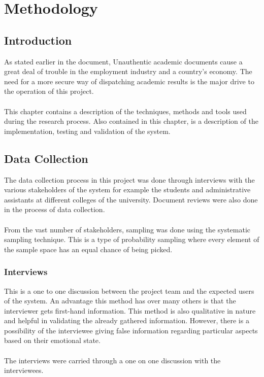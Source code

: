 \chapter{Methodology}

\section{Introduction}
As stated earlier in the document, Unauthentic academic documents cause a great deal of trouble in the employment industry and a country's economy. The need for a more secure way of dispatching academic results is the major drive to the operation of this project. \\~\\



This chapter contains a description of the techniques, methods and tools used during the research process. Also contained in this chapter, is a description of the implementation, testing and validation of the system. 

\section{Data Collection}
The data collection process in this project was done through interviews with the various stakeholders of the system for example the students and administrative assistants at different colleges of the university. Document reviews were also done in the process of data collection.\\~\\
From the vast number of stakeholders, sampling was done using the systematic sampling technique. This is a type of probability sampling where every element of the sample space has an equal chance of being picked. 

\subsection{Interviews}

This is a one to one discussion between the project team and the expected users of the system. An advantage this method has over many others is that the interviewer gets first-hand information. This method is also qualitative in nature and  helpful in validating the already gathered information. However, there is a possibility of the interviewee giving false information regarding particular aspects based on their emotional state. \\~\\
The interviews were carried through a one on one discussion with the interviewees.\\~\\

